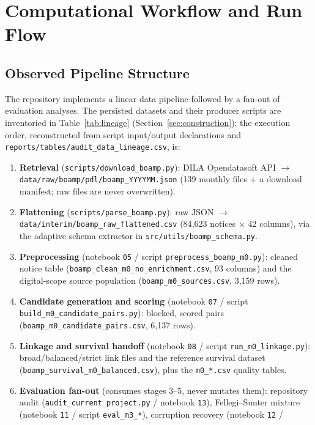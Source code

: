 \documentclass[11pt]{article}
\begin{document}
\section{Computational Workflow and Run Flow}
\label{sec:workflow}

\subsection{Observed Pipeline Structure}
The repository implements a linear data pipeline followed by a fan-out of
evaluation analyses. The persisted datasets and their producer scripts are
inventoried in Table~\ref{tab:lineage} (Section~\ref{sec:construction});
the execution order, reconstructed from script input/output declarations
and \texttt{reports/tables/audit\_data\_lineage.csv}, is:
\begin{enumerate}
  \item \textbf{Retrieval} (\texttt{scripts/download\_boamp.py}): DILA
  Opendatasoft API $\rightarrow$ \texttt{data/raw/boamp/pdl/boamp\_YYYYMM.json}
  (139 monthly files + a download manifest; raw files are never
  overwritten).
  \item \textbf{Flattening} (\texttt{scripts/parse\_boamp.py}): raw JSON
  $\rightarrow$ \texttt{data/interim/boamp\_raw\_flattened.csv} (84{,}623
  notices $\times$ 42 columns), via the adaptive schema extractor in
  \texttt{src/utils/boamp\_schema.py}.
  \item \textbf{Preprocessing} (notebook \texttt{05} / script
  \texttt{preprocess\_boamp\_m0.py}): cleaned notice table
  (\texttt{boamp\_clean\_m0\_no\_enrichment.csv}, 93 columns) and the
  digital-scope source population (\texttt{boamp\_m0\_sources.csv},
  3{,}159 rows).
  \item \textbf{Candidate generation and scoring} (notebook \texttt{07} /
  script \texttt{build\_m0\_candidate\_pairs.py}): blocked, scored pairs
  (\texttt{boamp\_m0\_candidate\_pairs.csv}, 6{,}137 rows).
  \item \textbf{Linkage and survival handoff} (notebook \texttt{08} /
  script \texttt{run\_m0\_linkage.py}): broad/balanced/strict link files
  and the reference survival dataset
  (\texttt{boamp\_survival\_m0\_balanced.csv}), plus the
  \texttt{m0\_*.csv} quality tables.
  \item \textbf{Evaluation fan-out} (consumes stages 3--5, never mutates
  them): repository audit (\texttt{audit\_current\_project.py} / notebook
  \texttt{13}), Fellegi--Sunter mixture (notebook \texttt{11} / script
  \texttt{eval\_m3\_*}), corruption recovery (notebook \texttt{12} /

\end{enumerate}
\end{document}
